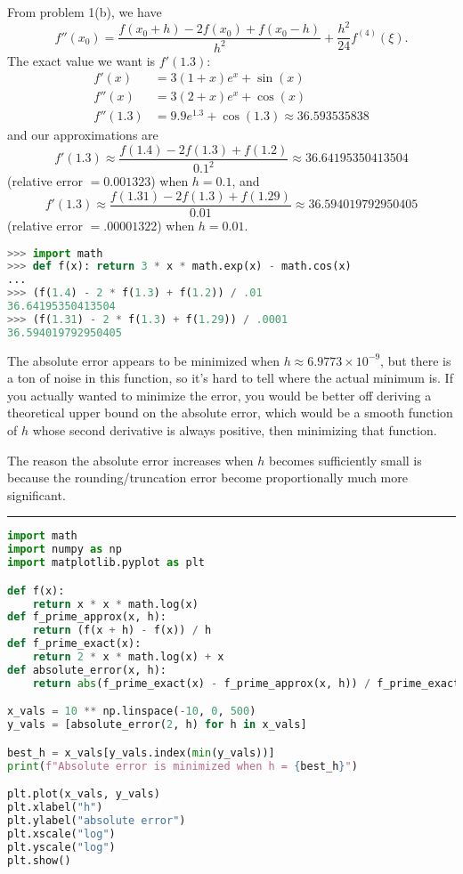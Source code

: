 \documentclass{article}
\begin{document}
\bigskip
\begin{prob}
\end{prob}
From problem 1(b), we have
\[ f''(x_0) = \frac{f(x_0+h)-2f(x_0)+f(x_0-h)}{h^2} + \frac{h^2}{24} f^{(4)}(\xi). \]
The exact value we want is $f'(1.3)$:
\begin{align*}
    f'(x) &= 3(1+x)e^x+\sin(x) \\
    f''(x) &= 3(2+x)e^x +\cos(x) \\
    f''(1.3) &= 9.9e^{1.3}+\cos(1.3) \approx 36.593535838
\end{align*}
and our approximations are
\[ f'(1.3) \approx \frac{f(1.4)-2f(1.3)+f(1.2)}{0.1^2} \approx 36.64195350413504 \]
(relative error $= 0.001323$) when $h=0.1$, and
\[ f'(1.3) \approx \frac{f(1.31)-2f(1.3)+f(1.29)}{0.01} \approx 36.594019792950405 \]
(relative error $= .00001322$) when $h=0.01$.

\bigskip
\begin{lstlisting}[language=Python]
>>> import math
>>> def f(x): return 3 * x * math.exp(x) - math.cos(x)
... 
>>> (f(1.4) - 2 * f(1.3) + f(1.2)) / .01
36.64195350413504
>>> (f(1.31) - 2 * f(1.3) + f(1.29)) / .0001
36.594019792950405
\end{lstlisting}

\bigskip
\begin{prob}
\end{prob}
The absolute error appears to be minimized when $h \approx 6.9773 \times 10^{-9}$, but there is a ton of noise in this function, so it's hard to tell where the actual minimum is. If you actually wanted to minimize the error, you would be better off deriving a theoretical upper bound on the absolute error, which would be a smooth function of $h$ whose second derivative is always positive, then minimizing that function.
\par
The reason the absolute error increases when $h$ becomes sufficiently small is because the rounding/truncation error become proportionally much more significant.

\noindent\rule{\linewidth}{0.4pt}
\par
\begin{lstlisting}[language=Python]
import math
import numpy as np
import matplotlib.pyplot as plt

def f(x):
    return x * x * math.log(x)
def f_prime_approx(x, h):
    return (f(x + h) - f(x)) / h
def f_prime_exact(x):
    return 2 * x * math.log(x) + x
def absolute_error(x, h):
    return abs(f_prime_exact(x) - f_prime_approx(x, h)) / f_prime_exact(x)

x_vals = 10 ** np.linspace(-10, 0, 500)
y_vals = [absolute_error(2, h) for h in x_vals]

best_h = x_vals[y_vals.index(min(y_vals))]
print(f"Absolute error is minimized when h = {best_h}")

plt.plot(x_vals, y_vals)
plt.xlabel("h")
plt.ylabel("absolute error")
plt.xscale("log")
plt.yscale("log")
plt.show()
\end{lstlisting}


\end{document}
